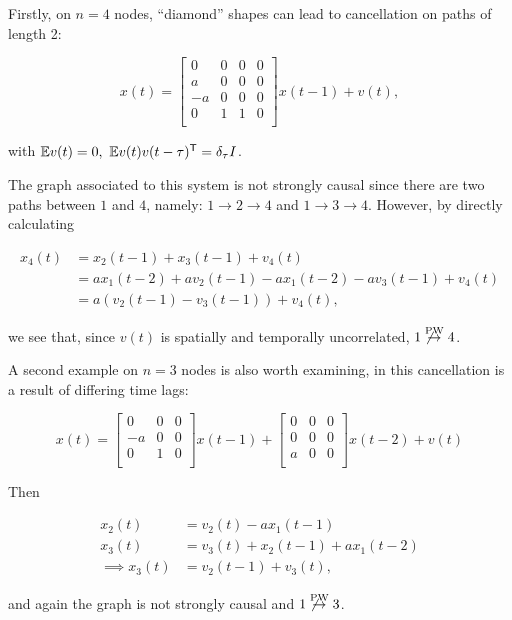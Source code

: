 \documentclass[12pt]{article}
\def\pwgc{\overset{\text{PW}}{\rightarrow}}  %
\begin{document}
\begin{example}
  Firstly, on $n = 4$ nodes, ``diamond'' shapes can lead to cancellation on paths of length 2:

\begin{equation*}
  x(t) =
  \left[
    \begin{array}{cccc}
      0 & 0 & 0 & 0\\
      a & 0 & 0 & 0\\
      -a & 0 & 0 & 0\\
      0 & 1 & 1 & 0\\
    \end{array}
  \right] x(t - 1) + v(t),
\end{equation*}

with $\mathbb{E} v(t) = 0,\ \mathbb{E} v(t)v(t - \tau)^{\mathsf{T}} = \delta_\tau I$.

The graph associated to this system is not strongly causal since there are two paths between $1$ and $4$, namely: $1 \rightarrow 2 \rightarrow 4$ and $1 \rightarrow 3 \rightarrow 4$.  However, by directly calculating

\begin{align*}
  x_4(t) &= x_2(t - 1) + x_3(t - 1) + v_4(t)\\
         &= ax_1(t - 2) + av_2(t - 1) - ax_1(t - 2) -av_3(t - 1) + v_4(t)\\
         &= a(v_2(t - 1) - v_3(t - 1)) + v_4(t),
\end{align*}

we see that, since $v(t)$ is spatially and temporally uncorrelated, $1 \not\pwgc 4$.
\end{example}

\begin{example}
  A second example on $n = 3$ nodes is also worth examining, in this
  cancellation is a result of differing time lags:

\begin{equation*}
  x(t) =
  \left[
    \begin{array}{ccc}
      0 & 0 & 0\\
      -a & 0 & 0\\
      0 & 1 & 0\\
    \end{array}
  \right] x(t - 1) +
  \left[
    \begin{array}{ccc}
      0 & 0 & 0\\
      0 & 0 & 0\\
      a & 0 & 0\\
    \end{array}
  \right] x(t - 2) + v(t)
\end{equation*}

Then

\begin{align*}
  x_2(t) &= v_2(t) - ax_1(t - 1)\\
  x_3(t) &= v_3(t) + x_2(t - 1) + ax_1(t - 2)\\
  \implies x_3(t) &= v_2(t - 1) + v_3(t),
\end{align*}

and again the graph is not strongly causal and $1 \not\pwgc 3$.
\end{example}
\end{document}

